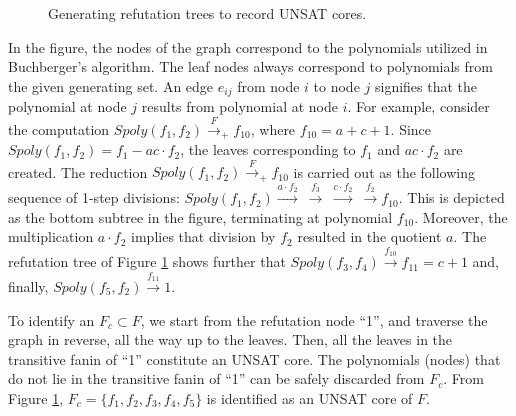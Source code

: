 \begin{figure}[h]
\caption{Generating refutation trees to record UNSAT cores.}
\label{fig:refute}
\end{figure}

In the figure, the nodes of the graph correspond to the polynomials
utilized in Buchberger's algorithm. The leaf nodes always correspond
to polynomials from the given generating set. An edge $e_{ij}$ from
node $i$ to node $j$ signifies that the polynomial at node $j$ results
from polynomial at node $i$. For example, consider the computation
$Spoly(f_1,f_2)\xrightarrow{F}_+ f_{10}$, where $f_{10} = a + c +
1$. Since $Spoly(f_1, f_2) = f_1 - ac\cdot f_2$, the leaves
corresponding to $f_1$ and $ac\cdot f_2$ are created. The reduction
$Spoly(f_1,f_2)\xrightarrow{F}_+ f_{10}$ is carried out as the
following sequence of 1-step divisions:
$Spoly(f_1,f_2)\xrightarrow{a\cdot f_2} ~\xrightarrow{f_3}~
\xrightarrow{c\cdot f_2}  ~\xrightarrow{f_2} f_{10}$. This is depicted
as the bottom subtree in the figure, terminating at polynomial
$f_{10}$. Moreover, the multiplication $a\cdot f_2$ implies that
division by $f_2$ resulted in the quotient $a$. The refutation tree of
Figure  \ref{fig:refute} shows further that
$Spoly(f_3,f_4)\xrightarrow{f_{10}} f_{11} = c+1$ and, finally,
$Spoly(f_5,f_2)\xrightarrow{f_{11}} 1$. 
 
To identify an $F_c \subset F$, we start from the refutation node
``1'', and traverse the graph in reverse, all the way up to the
leaves. Then, all the leaves in the transitive fanin of ``1''
constitute an UNSAT core. The polynomials (nodes) that do not lie in
the transitive fanin of ``1'' can be safely discarded from $F_c$. From
Figure \ref{fig:refute}, $F_c = \{f_1,f_2,f_3,f_4,f_5\}$ is identified
as an UNSAT core of $F$. 

